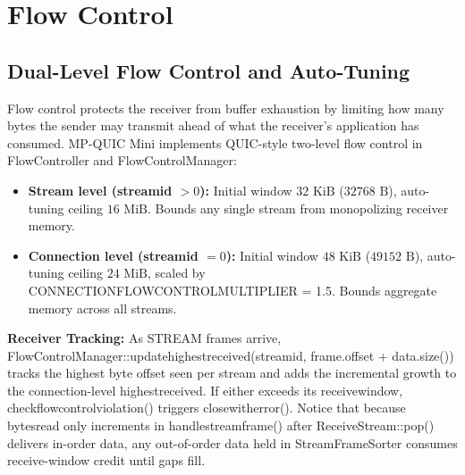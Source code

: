 \documentclass[10pt,a4paper]{article}
\newcommand{\codeul}{\textunderscore\hspace{0pt}}
\DeclareRobustCommand{\code}[1]{{\ttfamily\let\_\codeul #1}}
\begin{document}
\section{Flow Control}

\subsection{Dual-Level Flow Control and Auto-Tuning}
Flow control protects the receiver from buffer exhaustion by limiting how many bytes the sender may transmit ahead of what the receiver's application has consumed. MP-QUIC Mini implements QUIC-style two-level flow control in \code{FlowController} and \code{FlowControlManager}:
\begin{itemize}
    \item \textbf{Stream level (\code{stream\_id} $> 0$):} Initial window $32\text{ KiB}$ ($32768\text{ B}$), auto-tuning ceiling $16\text{ MiB}$. Bounds any single stream from monopolizing receiver memory.
    \item \textbf{Connection level (\code{stream\_id} $= 0$):} Initial window $48\text{ KiB}$ ($49152\text{ B}$), auto-tuning ceiling $24\text{ MiB}$, scaled by \code{CONNECTION\_FLOW\_CONTROL\_MULTIPLIER = 1.5}. Bounds aggregate memory across all streams.
\end{itemize}

\textbf{Receiver Tracking:}
As \code{STREAM} frames arrive, \code{FlowControlManager::update\_highest\_received(stream\_id, frame.offset + data.size())} tracks the highest byte offset seen per stream and adds the incremental growth to the connection-level \code{highest\_received}. If either exceeds its \code{receive\_window}, \code{check\_flow\_control\_violation()} triggers \code{close\_with\_error()}. Notice that because \code{bytes\_read} only increments in \code{handle\_stream\_frame()} after \code{ReceiveStream::pop()} delivers in-order data, any out-of-order data held in \code{StreamFrameSorter} consumes receive-window credit until gaps fill.
\end{document}
